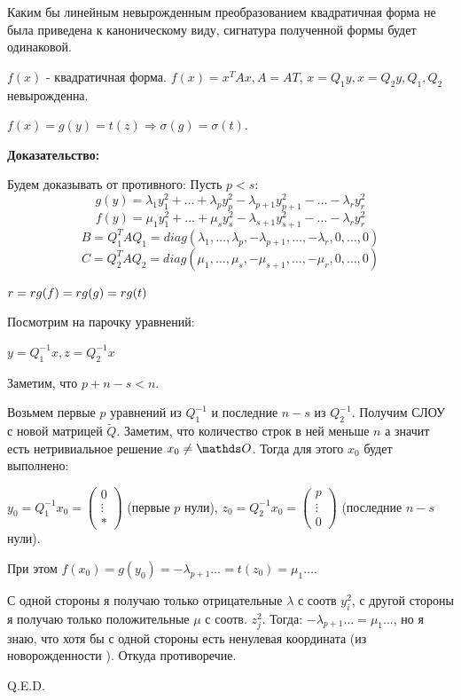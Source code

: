 Каким бы линейным невырожденным преобразованием квадратичная форма не была приведена к каноническому виду, сигнатура полученной формы будет одинаковой.

$f(x)$ - квадратичная форма. $f(x) = x^TAx, A= AT$, $x= Q_1 y, x = Q_2y, Q_1,Q_2$ невырожденна. 

$f(x) = g(y) = t(z) \Rightarrow \sigma(g) = \sigma(t)$.

\textbf{Доказательство:}

Будем доказывать от противного: Пусть $p<s$:
$$g(y) = \lambda_1 y_1^2 + \ldots + \lambda_p y_p^2 - \lambda_{p+1} y_{p+1}^2 - \ldots - \lambda_r y_r^2$$
$$f(y) = \mu_1 y_1^2 + \ldots + \mu_s y_s^2 - \lambda_{s+1} y_{s+1}^2 - \ldots - \lambda_r y_r^2$$
$$B = Q_1^TAQ_1 = diag(\lambda_1,\ldots,\lambda_p, -\lambda_{p+1},\ldots, -\lambda_r, 0 ,\ldots,0)$$
$$C = Q_2^TAQ_2 = diag(\mu_1,\ldots,\mu_s, -\mu_{s+1},\ldots, -\mu_r, 0 ,\ldots,0)$$ 

$r = rg(f) = rg (g) = rg(t)$

Посмотрим на парочку уравнений:

$y = Q^{-1}_1x, z = Q_2^{-1}x$

Заметим, что $p+n-s < n$.

Возьмем первые $p$ уравнений из $Q^{-1}_1$ и последние $n-s$ из $Q_2^{-1}$. Получим СЛОУ с новой матрицей $\tilde{Q}$. Заметим, что количество строк в ней меньше $n$ а значит есть нетривиальное решение $x_0 \neq \zero$. Тогда для этого $x_0$ будет выполнено:

$y_0 = Q^{-1}_1x_0 = \begin{pmatrix}
    0\\
    \vdots\\
    *
\end{pmatrix}$ (первые $p$ нули), \quad 
$z_0 = Q^{-1}_2x_0 = \begin{pmatrix}
    p\\
    \vdots\\
    0
\end{pmatrix}$ (последние $n-s$ нули). 

При этом $f(x_0) = g(y_0) = -\lambda_{p+1} \ldots = t(z_0)=\mu_1 \ldots $. 

С одной стороны я получаю только отрицательные $\lambda$ с соотв $y_i^2$, с другой стороны я получаю только положительные $\mu$ с соотв. $z_j^2$. Тогда:
 $-\lambda_{p+1} \ldots = \mu_1 \ldots $, но я знаю, что хотя бы с одной стороны есть ненулевая координата (из новорожденности ). Откуда противоречие.

\hfill Q.E.D.


